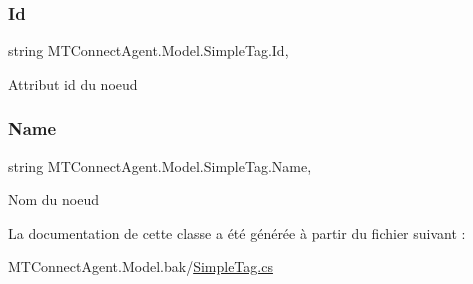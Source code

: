 \subsubsection{\texorpdfstring{Id}{Id}}
{\footnotesize\ttfamily string M\+T\+Connect\+Agent.\+Model.\+Simple\+Tag.\+Id\hspace{0.3cm}{\ttfamily [get]}, {\ttfamily [set]}}



Attribut id du noeud 

\mbox{\label{class_m_t_connect_agent_1_1_model_1_1_simple_tag_a6af48b2c6f3ab02d83de0c7cb2acb2e1}} 
\subsubsection{\texorpdfstring{Name}{Name}}
{\footnotesize\ttfamily string M\+T\+Connect\+Agent.\+Model.\+Simple\+Tag.\+Name\hspace{0.3cm}{\ttfamily [get]}, {\ttfamily [set]}}



Nom du noeud 



La documentation de cette classe a été générée à partir du fichier suivant \+:\begin{DoxyCompactItemize}
\item 
M\+T\+Connect\+Agent.\+Model.\+bak/\mbox{\hyperlink{_simple_tag_8cs}{Simple\+Tag.\+cs}}\end{DoxyCompactItemize}
